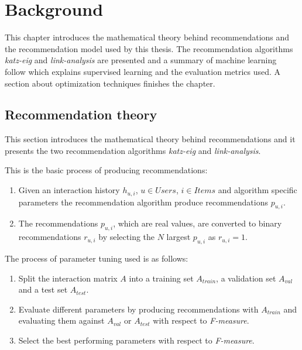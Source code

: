 
\chapter{Background}\label{cha:background}

This chapter introduces the mathematical theory behind recommendations and the recommendation model used by this thesis. The recommendation algorithms \textit{katz-eig} and \textit{link-analysis} are presented and a summary of machine learning follow which explains supervised learning and the evaluation metrics used. A section about optimization techniques finishes the chapter.


\section{Recommendation theory}

This section introduces the mathematical theory behind recommendations and it presents the two recommendation algorithms \textit{katz-eig} and \textit{link-analysis}.

This is the basic process of producing recommendations:

\begin{enumerate}
    \item Given an interaction history $h_{u, i}$, $u \in Users$, $i \in Items$ and algorithm specific parameters the recommendation algorithm produce recommendations $p_{u, i}$.
    \item The recommendations $p_{u, i}$, which are real values, are converted to binary recommendations $r_{u, i}$ by selecting the $N$ largest $p_{u, i}$ as $r_{u, i} = 1$.
\end{enumerate}

The process of parameter tuning used is as follows:

\begin{enumerate}
    \item Split the interaction matrix $A$ into a training set $A_{train}$, a validation set $A_{val}$ and a test set $A_{test}$.
    \item Evaluate different parameters by producing recommendations with $A_{train}$ and evaluating them against $A_{val}$ or $A_{test}$ with respect to \textit{F-measure}.
    \item Select the best performing parameters with respect to \textit{F-measure}.
\end{enumerate}




\newpage

\newpage


